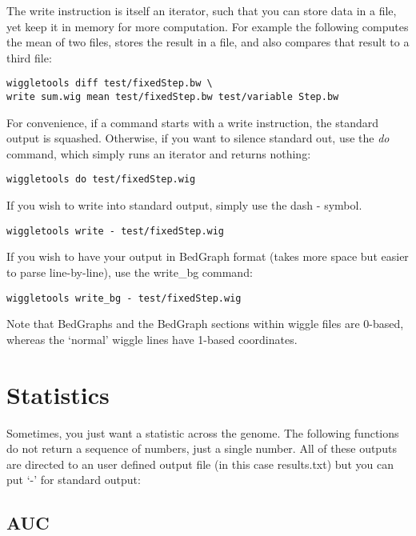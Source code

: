 \documentclass[12pt]{article}
\begin{document}
The write instruction is itself an iterator, such that you can store data in a file, yet keep it in memory for more computation. For example the following computes the mean of two files, stores the result in a file, and also compares that result to a third file:

\begin{verbatim}
wiggletools diff test/fixedStep.bw \
write sum.wig mean test/fixedStep.bw test/variable Step.bw 
\end{verbatim}

For convenience, if a command starts with a write instruction, the standard output is squashed. Otherwise, if you want to silence standard out, use the \emph{do} command, which simply runs an iterator and returns nothing: 

\begin{verbatim}
wiggletools do test/fixedStep.wig 
\end{verbatim}

If you wish to write into standard output, simply use the dash - symbol.

\begin{verbatim}
wiggletools write - test/fixedStep.wig 
\end{verbatim}

If you wish to have your output in BedGraph format (takes more space but easier to parse line-by-line), use the write\_bg command:

\begin{verbatim}
wiggletools write_bg - test/fixedStep.wig 
\end{verbatim}

Note that BedGraphs and the BedGraph sections within wiggle files are 0-based, whereas the `normal' wiggle lines have 1-based coordinates.

\section{Statistics}

Sometimes, you just want a statistic across the genome. The following functions do not return a sequence of numbers, just a single number. All of these outputs are directed to an user defined output file (in this case results.txt) but you can put `-' for standard output:

\subsection{AUC}
\end{document}
